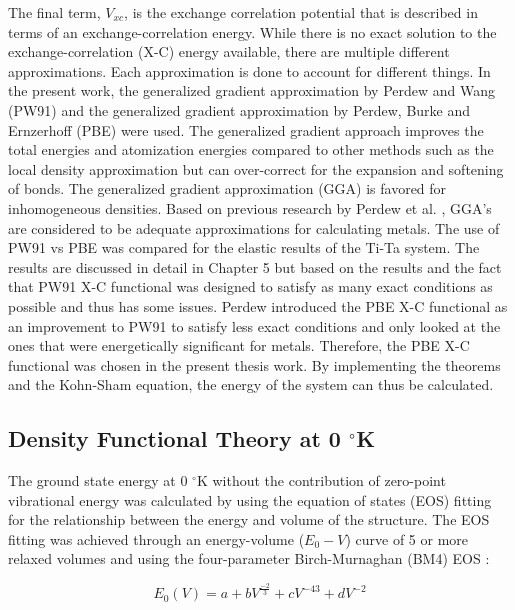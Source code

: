 \noindent The final term, $V_{xc}$, is the exchange correlation potential that is described in terms of an exchange-correlation energy. While there is no exact solution to the exchange-correlation (X-C) energy available, there are multiple different approximations. Each approximation is done to account for different things. In the present work, the generalized gradient approximation by Perdew and Wang (PW91) \cite{Perdew1992} and the generalized gradient approximation by Perdew, Burke and Ernzerhoff (PBE) \cite{Perdew1996a} were used. The generalized gradient approach improves the total energies and atomization energies compared to other methods such as the local density approximation \cite{Ceperley1980} but can over-correct for the expansion and softening of bonds. The generalized gradient approximation (GGA) is favored for inhomogeneous densities. Based on previous research by Perdew et al. \cite{Perdew1996a}, GGA's are considered to be adequate approximations for calculating metals. The use of PW91 vs PBE was compared for the elastic results of the Ti-Ta system. The results are discussed in detail in Chapter 5 but based on the results and the fact that PW91 X-C functional was designed to satisfy as many exact conditions as possible and thus has some issues. Perdew introduced the PBE X-C functional as an improvement to PW91 to satisfy less exact conditions and only looked at the ones that were energetically significant for metals. Therefore, the PBE X-C functional was chosen in the present thesis work. By implementing the theorems and the Kohn-Sham equation, the energy of the system can thus be calculated.

\subsection{Density Functional Theory at 0 $^\circ$K}

The ground state energy at 0 $^\circ$K without the contribution of zero-point vibrational energy was calculated by using the equation of states (EOS) fitting for the relationship between the energy and volume of the structure. The EOS fitting was achieved through an energy-volume ($E_{0}-V$) curve of 5 or more relaxed volumes and using the four-parameter Birch-Murnaghan (BM4) EOS \cite{Shang2010}:

\begin{equation}
\label{eq: zeroenergy}
E_{0}(V) = a + bV^{\frac{-2}{3}} + cV^{{-4}{3}} + dV^{-2}
\end{equation}

